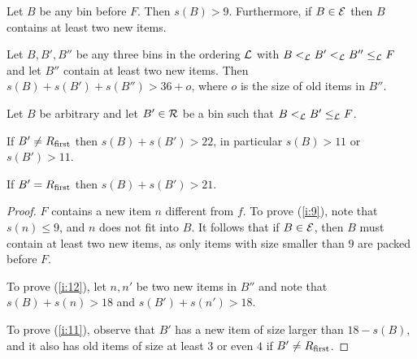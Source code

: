 \begin{lem}
\label{l:aux}
\begin{compactenum}[(i)]
\item
\label{i:9}
Let $B$ be any bin before $F$. Then $s(B)>9$. Furthermore, if
$B\in{\mathcal E}$ then $B$ contains at least two new items.
\item
\label{i:12}
Let $B,B',B''$ be any three bins in the ordering ${\mathcal L}$ with
$B <_{{\mathcal L}} B' <_{{\mathcal L}} B'' \leq_{{\mathcal L}} F$ and let $B''$ contain at least two new items. Then
$s(B)+s(B')+s(B'')>36+o$, where $o$ is the size of old items in $B''$.
\item  
\label{i:11}
Let $B$ be arbitrary and let $B'\in{\mathcal R}$ be a bin such that $B <_{{\mathcal L}} B' \leq_{{\mathcal L}} F$.

If $B'\neq R_{\mbox{\rm\scriptsize first}}$ then $s(B)+s(B')>22$, in
particular $s(B)>11$ or $s(B')>11$.

If $B'=R_{\mbox{\rm\scriptsize first}}$ then $s(B)+s(B')>21$.
\end{compactenum}
\end{lem}

\begin{proof}
$F$ contains a new item $n$ different from $f$. To prove (\ref{i:9}),
  note that $s(n)\leq 9$, and $n$ does not fit into $B$. It follows
  that if $B\in{\mathcal E}$, then $B$ must contain at least two new items,
  as only items with size smaller than $9$ are packed before $F$.

To prove (\ref{i:12}), let $n,n'$ be two new items in $B''$ and note
that $s(B)+s(n)>18$ and $s(B')+s(n')>18$.

To prove (\ref{i:11}), observe that $B'$ has a new
item of size larger than $18-s(B)$, and it also has old items of size
at least $3$ or even $4$ if $B'\neq R_{\mbox{\rm\scriptsize first}}$.
\end{proof}

